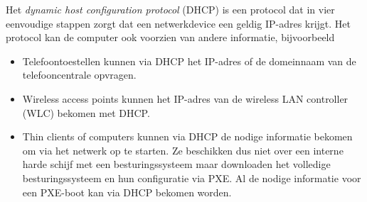 Het \emph{dynamic host configuration protocol} (DHCP) is een protocol dat in vier eenvoudige stappen zorgt dat een netwerkdevice een geldig IP-adres krijgt.
Het protocol kan de computer ook voorzien van andere informatie, bijvoorbeeld
\begin{itemize}
\item
   Telefoontoestellen kunnen via DHCP het IP-adres of de domeinnaam van de telefooncentrale opvragen.
\item
   Wireless access points kunnen het IP-adres van de wireless LAN controller (WLC) bekomen met DHCP.
\item
   Thin clients of computers kunnen via DHCP de nodige informatie bekomen om via het netwerk op te starten.
   Ze beschikken dus niet over een interne harde schijf met een besturingssysteem maar downloaden het volledige besturingssysteem en hun configuratie via PXE.
   Al de nodige informatie voor een PXE-boot kan via DHCP bekomen worden.
\end{itemize}

